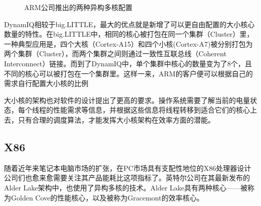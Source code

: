 \documentclass[UTF8,a4paper,10pt]{ctexart}
\begin{document}
\begin{figure}[htbp]
\centering
{}%
\centering
\caption{ARM公司推出的两种异构多核配置\cite{arm_dynamiq}}
\label{fig:arm_heter_cores}
\end{figure}

DynamIQ相较于big.LITTLE，最大的优点就是新增了可以更自由配置的大小核心数量的特性。在big.LITTLE中，相同的核心被打包在同一个集群（Cluster）里，一种典型应用是，四个大核（Cortex-A15）和四个小核(Cortex-A7)被分别打包为两个集群（Cluster），而两个集群之间则通过一致性互联总线（Coherent Interconnect）链接。而到了DynamIQ中，单个集群中核心的数量变为了8个，且不同的核心可以被打包在一个集群里。这样一来，ARM的客户便可以根据自己的需求自行配置大小核的比例 \cite{arm_dynamiq}

大小核的架构也对软件的设计提出了更高的要求。操作系统需要了解当前的电量状态，每个线程的性能需求等信息，并根据这些信息将线程转移到适合它们的核心上去，只有合理的调度算法，才能发挥大小核架构在效率方面的潜能。

\subsection{X86}

随着近年来笔记本电脑市场的扩张，在PC市场具有支配性地位的X86处理器设计公司们也愈来愈需要关注其产品能耗比这项指标了。英特尔公司在其最新发布的Alder Lake架构中，也使用了异构多核的技术。Alder Lake具有两种核心——被称为Golden Cove的性能核心，以及被称为Gracemont的效率核心。
\end{document}
